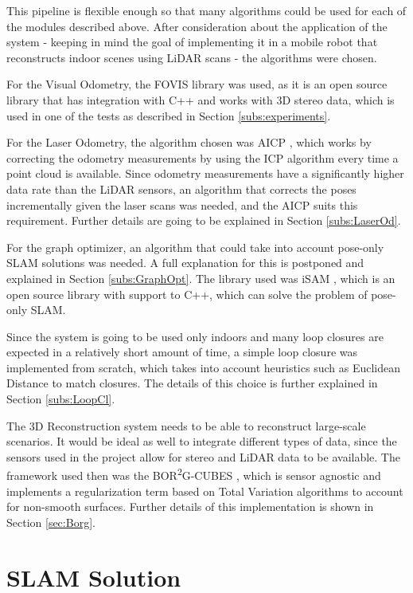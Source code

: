 \documentclass[11pt]{article}
\begin{document}
This pipeline is flexible enough so that many algorithms could be used for each of the modules described above. After consideration about the application of the system - keeping in mind the goal of implementing it in a mobile robot that reconstructs indoor scenes using LiDAR scans - the algorithms were chosen.
	
For the Visual Odometry, the FOVIS library \cite{fovis} was used, as it is an open source library that has integration with C++ and works with 3D stereo data, which is used in one of the tests as described in Section \ref{subs:experiments}.
	
For the Laser Odometry, the algorithm chosen was AICP \cite{7989547}, which works by correcting the odometry measurements by using the ICP algorithm every time a point cloud is available. Since odometry measurements have a significantly higher data rate than the LiDAR sensors, an algorithm that corrects the poses incrementally given the laser scans was needed, and the AICP suits this requirement. Further details are going to be explained in Section \ref{subs:LaserOd}.
	
For the graph optimizer, an algorithm that could take into account pose-only SLAM solutions was needed. A full explanation for this is postponed and explained in Section \ref{subs:GraphOpt}. The library used was iSAM \cite{Kaess08tro}, which is an open source library with support to C++, which can solve the problem of pose-only SLAM.
	
Since the system is going to be used only indoors and many loop closures are expected in a relatively short amount of time, a simple loop closure was implemented from scratch, which takes into account heuristics such as Euclidean Distance to match closures. The details of this choice is further explained in Section \ref{subs:LoopCl}.
	
The 3D Reconstruction system needs to be able to reconstruct large-scale scenarios. It would be ideal as well to integrate different types of data, since the sensors used in the project allow for stereo and LiDAR data to be available. The framework used then was the BOR\textsuperscript{2}G-CUBES \cite{TannerFSR2015}\cite{TannerArXiv2016}, which is sensor agnostic and implements a regularization term based on Total Variation algorithms to account for non-smooth surfaces. Further details of this implementation is shown in Section \ref{sec:Borg}.
		
	\newpage
	\section{SLAM Solution}
\end{document}
